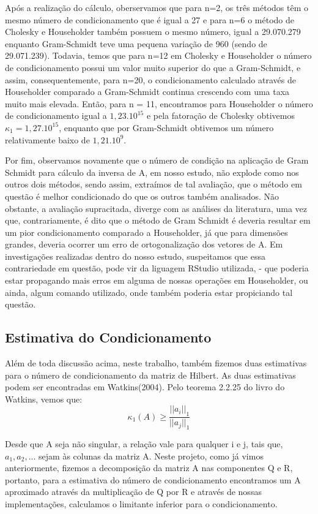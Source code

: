 \documentclass[12pt, a4paper]{article}
\begin{document}
Após a realização do cálculo, oberservamos que para n=2, os três métodos têm o mesmo número de condicionamento que é igual a 27 e para n=6 o método de Cholesky e Householder também possuem o mesmo número, igual a 29.070.279 enquanto Gram-Schmidt teve uma pequena variação de 960 (sendo de 29.071.239). Todavia, temos que para n=12 em Cholesky e Householder o número de condicionamento possui um valor muito superior do que a Gram-Schmidt, e assim, consequentemente, para n=20, o condicionamento calculado através de Householder comparado a Gram-Schmidt continua crescendo com uma taxa muito mais elevada. 
Então, para n = 11, encontramos para Householder o número de condicionamento igual a $1,23.10^{15}$ e pela fatoração de Cholesky obtivemos $\kappa_1 = 1,27.10^{15}$, enquanto que por Gram-Schmidt obtivemos um número relativamente baixo de $1,21.10^{9}$.

Por fim, observamos novamente que o número de condição na aplicação de Gram Schmidt para cálculo da inversa de A, em nosso estudo,  não explode como nos outros dois métodos, sendo assim, extraímos de tal avaliação, que o método em questão é melhor condicionado do que os outros também analisados. 
Não obstante, a avaliação supracitada, diverge com as análises da literatura, uma vez que, contrariamente, é dito que o método de Gram Schmidt é deveria resultar em um pior condicionamento comparado a Householder, já que para dimensões grandes, deveria ocorrer um erro de ortogonalização dos vetores de A. Em investigações realizadas dentro do nosso estudo, suspeitamos que essa contrariedade em questão, pode vir da liguagem RStudio utilizada, - que poderia estar propagando mais erros em alguma de nossas operações em Householder, ou ainda, algum comando utilizado, onde também poderia estar propiciando tal questão.

\subsection{Estimativa do Condicionamento}

Além de toda discussão acima, neste trabalho, também fizemos duas estimativas para o número de condicionamento da matriz de Hilbert. As duas estimativas podem ser encontradas em Watkins(2004).
Pelo teorema 2.2.25 do livro do Watkins, vemos que:
\begin{equation}
    \kappa_1(A) \geq \frac{||a_i||_1}{||a_j||_1}
\end{equation}

Desde que A seja não singular, a relação vale para qualquer i e j, tais que, $a_1, a_2,... $ sejam às colunas da matriz A. Neste projeto, como já vimos anteriormente, fizemos a decomposição da matriz A nas componentes Q e R, portanto, para a estimativa do número de condicionamento encontramos um A aproximado através da multiplicação de Q por R e através de nossas implementações, calculamos o limitante inferior para o condicionamento.
\end{document}
